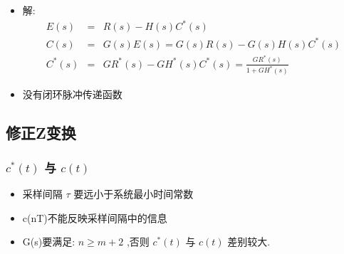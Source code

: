 \documentclass[table]{beamer}
\begin{document}
\begin{frame}
\begin{itemize}
\item <2->解:
      \begin{eqnarray*}
      E(s) &=& R(s)-H(s)C^*(s)\\
      C(s) & = & G(s)E(s) 
          = G(s)R(s)-G(s)H(s)C^*(s)\\
      C^*(s) &=& GR^*(s)-GH^*(s)C^*(s)
             = \frac{GR^*(s)}{1+GH^*(s)}
      \end{eqnarray*}
\item <3->没有闭环脉冲传递函数
\end{itemize}
\end{frame}
\subsection{修正Z变换}
\label{sec-4-5}
\begin{frame}
\frametitle{$c^*(t)$ 与 $c(t)$}
\label{sec-4-5-1}

\begin{itemize}
\item <2->采样间隔 $\tau$  要远小于系统最小时间常数
\item <3->c(nT)不能反映采样间隔中的信息
\item <4->G(s)要满足:  $n\geq m+2$  ,否则  $c^*(t)$  与  $c(t)$  差别较大.
\end{itemize}
\end{frame}
\end{document}
